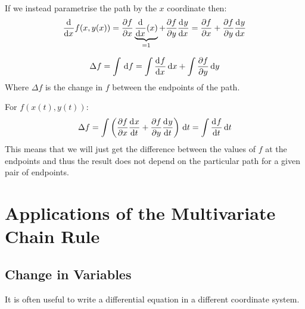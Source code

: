 \documentclass[../main.tex]{subfiles}
\begin{document}
If we instead parametrise the path by the $x$ coordinate then:
\[
  \deriv{}{x}f(x, y(x)) = \pderiv{f}{x} \underbrace{\deriv{}{x}(x)}_{=1} + \pderiv{f}{y} \deriv{y}{x} = \pderiv{f}{x} + \pderiv{f}{y}\deriv{y}{x}
\]
\begin{theorem}
  \[
    \Delta f = \int  \d{f} = \int \deriv{f}{x} \d{x} + \int \pderiv{f}{y} \d{y}
  \]
  Where $\Delta f$ is the change in $f$ between the endpoints of the path.
\end{theorem}
For $f(x(t), y(t))$:
\[
  \Delta f = \int \left(\pderiv{f}{x}\deriv{x}{t} + \pderiv{f}{y}\deriv{y}{t}\right) \d{t} = \int \deriv{f}{t} \d{t}
\]
This means that we will just get the difference between the values of $f$ at the endpoints and thus the result does not depend on the particular path for a given pair of endpoints.
\section{Applications of the Multivariate Chain Rule}
\subsection{Change in Variables}
It is often useful to write a differential equation in a different coordinate system.
\end{document}
